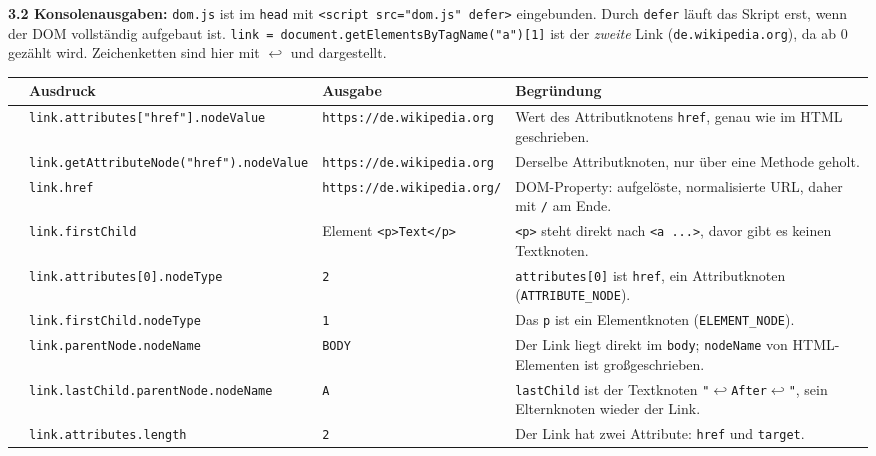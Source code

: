 \documentclass[11pt,a4paper]{article}
\newcommand{\RET}{\ensuremath{\hookleftarrow}\allowbreak}
\newcommand{\VS}{\textvisiblespace}
\newcommand{\IV}{\VS\VS\VS\VS\allowbreak}
\begin{document}
\medskip
\textbf{3.2 Konsolenausgaben:} \texttt{dom.js} ist im \texttt{head} mit
\texttt{<script src="dom.js" defer>} eingebunden. Durch \texttt{defer}
läuft das Skript erst, wenn der DOM vollständig aufgebaut ist.
\texttt{link = document.getElementsByTagName("a")[1]} ist der
\emph{zweite} Link (\texttt{de.wikipedia.org}), da ab 0 gezählt wird.
Zeichenketten sind hier mit \RET{} und \VS{} dargestellt.

{\small
\begin{center}
\begin{tabular}{|>{\raggedright\arraybackslash}p{0.45cm}|>{\raggedright\arraybackslash}p{4.45cm}|>{\raggedright\arraybackslash}p{4.0cm}|>{\raggedright\arraybackslash}p{5.25cm}|}
\hline
 & \textbf{Ausdruck} & \textbf{Ausgabe} & \textbf{Begründung} \\ \hline
1 & \nolinkurl{link.attributes["href"].nodeValue} & \nolinkurl{https://de.wikipedia.org} & Wert des Attributknotens \texttt{href}, genau wie im HTML geschrieben. \\ \hline
2 & \nolinkurl{link.getAttributeNode("href").nodeValue} & \nolinkurl{https://de.wikipedia.org} & Derselbe Attributknoten, nur über eine Methode geholt. \\ \hline
3 & \nolinkurl{link.href} & \nolinkurl{https://de.wikipedia.org/} & DOM-Property: aufgelöste, normalisierte URL, daher mit \texttt{/} am Ende. \\ \hline
4 & \nolinkurl{link.firstChild} & Element \texttt{<p>Text</p>} & \texttt{<p>} steht direkt nach \texttt{<a ...>}, davor gibt es keinen Textknoten. \\ \hline
5 & \nolinkurl{link.attributes[0].nodeType} & \texttt{2} & \texttt{attributes[0]} ist \texttt{href}, ein Attributknoten (\texttt{ATTRIBUTE\_NODE}). \\ \hline
6 & \nolinkurl{link.firstChild.nodeType} & \texttt{1} & Das \texttt{p} ist ein Elementknoten (\texttt{ELEMENT\_NODE}). \\ \hline
7 & \nolinkurl{link.parentNode.nodeName} & \texttt{BODY} & Der Link liegt direkt im \texttt{body}; \texttt{nodeName} von HTML-Elementen ist großgeschrieben. \\ \hline
8 & \nolinkurl{link.lastChild.parentNode.nodeName} & \texttt{A} & \texttt{lastChild} ist der Textknoten \texttt{"\RET\IV After\RET"}, sein Elternknoten wieder der Link. \\ \hline
9 & \nolinkurl{link.attributes.length} & \texttt{2} & Der Link hat zwei Attribute: \texttt{href} und \texttt{target}. \\ \hline

\end{tabular}
\end{center}}
\end{document}
